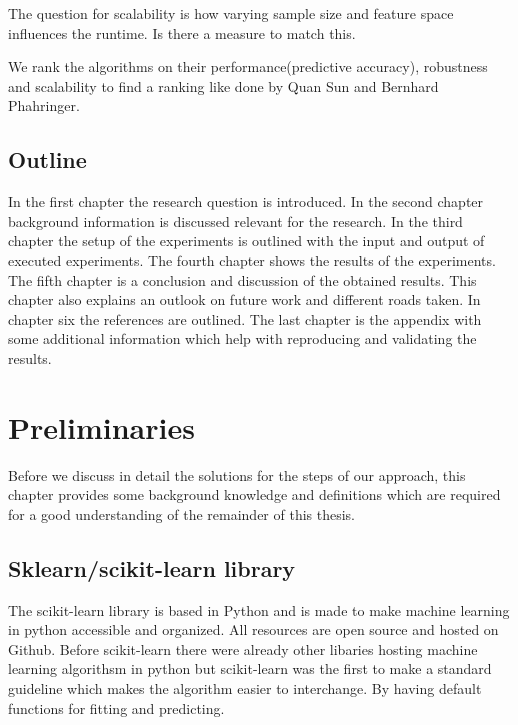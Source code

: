 \documentclass[a4paper,10pt]{article}
\begin{document}
The question for scalability is how varying sample size and feature space influences the runtime. Is there a measure to match this. 

We rank the algorithms on their performance(predictive accuracy), robustness and scalability to find a ranking like done by Quan Sun and Bernhard Phahringer\cite{ranking}.




\subsection{Outline}
In the first chapter the research question is introduced. In the second chapter background information is discussed relevant for the research. In the third chapter the setup of the experiments is outlined with the input and output of executed experiments. The fourth chapter shows the results of the experiments. The fifth chapter is a conclusion and discussion of the obtained results. This chapter also explains an outlook on future work and different roads taken. In chapter six the references are outlined. The last chapter is the appendix with some additional information which help with reproducing and validating the results. 
\newpage


\section{Preliminaries} \label{Chapter2}
Before we discuss in detail the solutions for the steps of our approach, this chapter provides
some background knowledge and definitions which are required for a good understanding of
the remainder of this thesis.
\subsection{Sklearn/scikit-learn library}
The scikit-learn library is based in Python and is made to make machine learning in python accessible and organized. 
All resources are open source and hosted on Github. Before scikit-learn there were already other libaries hosting machine learning algorithsm in python but scikit-learn was the first to make a standard guideline which makes the algorithm easier to interchange. By having default functions for fitting and predicting.
\end{document}
